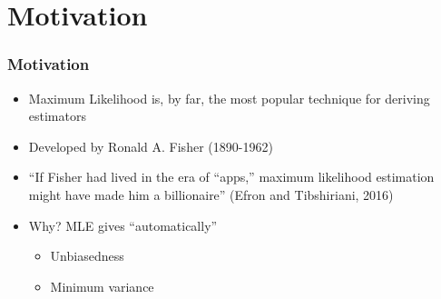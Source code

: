 \documentclass[
  shownotes,
  xcolor={svgnames},
  hyperref={colorlinks,citecolor=DarkBlue,linkcolor=DarkRed,urlcolor=DarkBlue}
  , aspectratio=169]{beamer}
\begin{document}
\section{Motivation}
\begin{frame}[fragile]
\frametitle{Motivation}

\begin{itemize}
    \item Maximum Likelihood is, by far, the most popular technique for deriving estimators
    \bigskip 
    \item Developed by Ronald A. Fisher (1890-1962)
    \bigskip
    \item ``If Fisher had lived in the era of ``apps,'' maximum likelihood estimation might have made him a billionaire'' (Efron and Tibshiriani, 2016)
    \bigskip
    \item  Why? MLE gives ``automatically''
    \begin{itemize}
      \item Unbiasedness 
      \medskip
      \item Minimum variance
    \end{itemize} 
\end{itemize}
 


 \end{frame}
\end{document}

